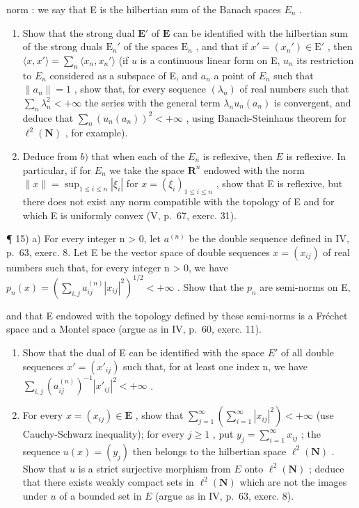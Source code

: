 norm : we say that E is the hilbertian sum of the Banach spaces \(E_{n}\) .

\begin{enumerate}
\def\labelenumi{\alph{enumi})}
\setcounter{enumi}{1}
\item
  Show that the strong dual \(\mathbf{E}'\) of \(\mathbf{E}\) can be identified with the hilbertian sum of the strong duals \(\mathrm{E}_n'\) of the spaces \(\mathrm{E}_n\) , and that if \(x' = (x_n') \in \mathrm{E}'\) , then \(\langle x, x' \rangle = \sum_{n} \langle x_n, x_n' \rangle\) (if \(u\) is a continuous linear form on E, \(u_{n}\) its restriction to \(E_{n}\) considered as a subspace of E, and \(a_{n}\) a point of \(E_{n}\) such that \(\|a_{n}\|=1\) , show that, for every sequence \((\lambda_{n})\) of real numbers such that \(\sum_{n}\lambda_{n}^{2}<+\infty\) the series with the general term \(\lambda_{n}u_{n}(a_{n})\) is convergent, and deduce that \(\sum_{n}(u_{n}(a_{n}))^{2}<+\infty\) , using Banach-Steinhaus theorem for \(\ell^{2}(\mathbf{N})\) , for example).
\item
  Deduce from \(b)\) that when each of the \(E_n\) is reflexive, then \(E\) is reflexive. In particular, if for \(E_n\) we take the space \(\mathbf{R}^n\) endowed with the norm \(\| x \| = \sup_{1 \leqslant i \leqslant n} |\xi_i|\) for \(x = (\xi_i)_{1 \leqslant i \leqslant n}\) , show that E is reflexive, but there does not exist any norm compatible with the topology of E and for which E is uniformly convex (V, p.~67, exerc. 31).
\end{enumerate}

¶ 15) a) For every integer n \textgreater{} 0, let \(a^{(n)}\) be the double sequence defined in IV, p.~63, exerc. 8. Let E be the vector space of double sequences \(x = (x_{ij})\) of real numbers such that, for every integer n \textgreater{} 0, we have \(p_n(x) = (\sum_{i,j} a_{ij}^{(n)} |x_{ij}|^2)^{1/2} < +\infty\) . Show that the \(p_n\) are semi-norms on E,

and that E endowed with the topology defined by these semi-norms is a Fréchet space and a Montel space (argue as in IV, p.~60, exerc. 11).

\begin{enumerate}
\def\labelenumi{\alph{enumi})}
\setcounter{enumi}{1}
\item
  Show that the dual of E can be identified with the space \(E'\) of all double sequences \(x' = (x'_{ij})\) such that, for at least one index n, we have \(\sum_{i,j} (a_{ij}^{(n)})^{-1} |x'_{ij}|^2 < +\infty\) .
\item
  For every \(x = (x_{ij}) \in \mathbf{E}\) , show that \(\sum_{j=1}^{\infty} \left( \sum_{i=1}^{\infty} |x_{ij}|^2 \right) < +\infty\) (use Cauchy-Schwarz inequality); for every \(j \geqslant 1\) , put \(y_j = \sum_{i=1}^{\infty} x_{ij}\) ; the sequence \(u(x) = (y_j)\) then belongs to the hilbertian space \(\ell^2(\mathbf{N})\) . Show that \(u\) is a strict surjective morphism from \(E\) onto \(\ell^2(\mathbf{N})\) ; deduce that there exists weakly compact sets in \(\ell^2(\mathbf{N})\) which are not the images under \(u\) of a bounded set in \(E\) (argue as in IV, p.~63, exerc. 8).
\end{enumerate}

